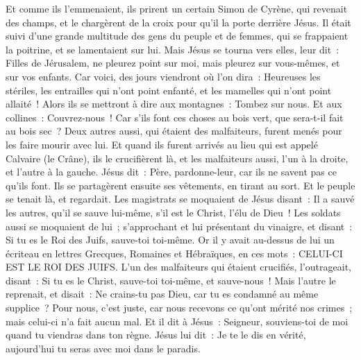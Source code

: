 \begin{multicols}{2}
Et comme ils l'emmenaient, ils prirent un certain Simon de Cyrène, qui revenait des champs, et le chargèrent de la croix pour qu'il la porte derrière Jésus.
Il était suivi d'une grande multitude des gens du peuple et de femmes, qui se frappaient la poitrine, et se lamentaient sur lui.
Mais Jésus se tourna vers elles, leur dit~: Filles de Jérusalem, ne pleurez point sur moi, mais pleurez sur vous-mêmes, et sur vos enfants.
Car voici, des jours viendront où l'on dira~: Heureuses les stériles, les entrailles qui n'ont point enfanté, et les mamelles qui n'ont point allaité~!
Alors ils se mettront à dire aux montagnes~: Tombez sur nous. Et aux collines~: Couvrez-nous~!
Car s'ils font ces choses au bois vert, que sera-t-il fait au bois sec~?
Deux autres aussi, qui étaient des malfaiteurs, furent menés pour les faire mourir avec lui.
Et quand ils furent arrivés au lieu qui est appelé Calvaire (le Crâne), ils le crucifièrent là, et les malfaiteurs aussi, l'un à la droite, et l'autre à la gauche.
Jésus dit~: Père, pardonne-leur, car ils ne savent pas ce qu'ils font. Ils se partagèrent ensuite ses vêtements, en tirant au sort.
Et le peuple se tenait là, et regardait. Les magistrats se moquaient de Jésus disant~: Il a sauvé les autres, qu'il se sauve lui-même, s'il est le Christ, l'élu de Dieu~!
Les soldats aussi se moquaient de lui~; s'approchant et lui présentant du vinaigre,
et disant~: Si tu es le Roi des Juifs, sauve-toi toi-même.
Or il y avait au-dessus de lui un écriteau en lettres Grecques, Romaines et Hébraïques, en ces mots~: CELUI-CI EST LE ROI DES JUIFS.
L'un des malfaiteurs qui étaient crucifiés, l'outrageait, disant~: Si tu es le Christ, sauve-toi toi-même, et sauve-nous~!
Mais l'autre le reprenait, et disait~: Ne crains-tu pas Dieu, car tu es condamné au même supplice~?
Pour nous, c'est juste, car nous recevons ce qu'ont mérité nos crimes~; mais celui-ci n'a fait aucun mal.
Et il dit à Jésus~: Seigneur, souviens-toi de moi quand tu viendras dans ton règne.
Jésus lui dit~: Je te le dis en vérité, aujourd'hui tu seras avec moi dans le paradis.

\end{multicols}
